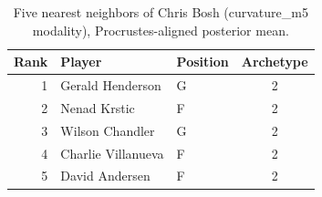 \begin{table}[htbp]
  \centering\small
  \begin{tabular}{rllc}
    \toprule
    Rank & Player & Position & Archetype \\
    \midrule
    1 & Gerald Henderson & G & 2 \\
    2 & Nenad Krstic & F & 2 \\
    3 & Wilson Chandler & G & 2 \\
    4 & Charlie Villanueva & F & 2 \\
    5 & David Andersen & F & 2 \\
    \bottomrule
  \end{tabular}
  \caption{Five nearest neighbors of Chris Bosh (curvature_m5 modality), Procrustes-aligned posterior mean.}
  \label{tab:Chris_Bosh_neighbors_curvature_m5}
\end{table}


